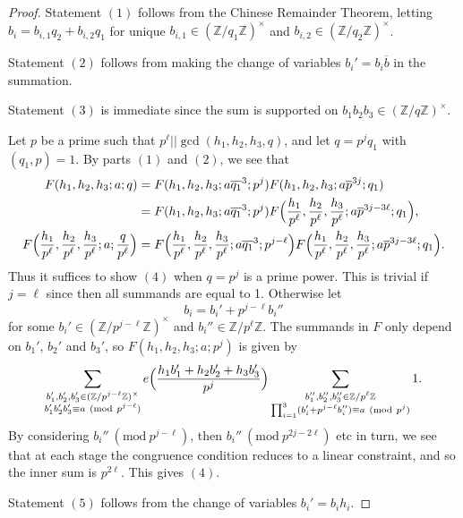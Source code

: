 \documentclass[10pt]{amsart}
\theoremstyle{plain}
\numberwithin{equation}{section}
\newcommand{\Mod}[1]{\ (\mathrm{mod}\ #1)}
\begin{document}
\begin{proof}
Statement $(1)$ follows from the Chinese Remainder Theorem, letting $b_i=b_{i,1}q_2+b_{i,2}q_1$ for unique $b_{i,1}\in(\mathbb{Z}/q_1\mathbb{Z})^\times$ and $b_{i,2}\in (\mathbb{Z}/q_2\mathbb{Z})^\times$.

Statement $(2)$ follows from making the change of variables $b_i'=b_i\overline{b}$ in the summation.

Statement $(3)$ is immediate since the sum is supported on $b_1b_2b_3\in (\mathbb{Z}/q\mathbb{Z})^\times$.

Let $p$ be a prime such that $p^\ell||\gcd(h_1,h_2,h_3,q)$, and let $q=p^jq_1$ with $(q_1,p)=1$. By parts $(1)$ and $(2)$, we see that
\begin{align*}
F(h_1,h_2,h_3;a;q)&=F(h_1,h_2,h_3;a\overline{q_1}^3;p^j)F(h_1,h_2,h_3;a\overline{p}^{3j};q_1)\\
&=F(h_1,h_2,h_3;a\overline{q_1}^3;p^j)F\Bigl(\frac{h_1}{p^\ell},\frac{h_2}{p^\ell},\frac{h_3}{p^\ell};a\overline{p}^{3j-3\ell};q_1\Bigr),\\
F\Bigl(\frac{h_1}{p^\ell},\frac{h_2}{p^\ell},\frac{h_3}{p^\ell};a;\frac{q}{p^\ell}\Bigr)&=F\Bigl(\frac{h_1}{p^\ell},\frac{h_2}{p^\ell},\frac{h_3}{p^\ell};a\overline{q_1}^3;p^{j-\ell}\Bigr)F\Bigl(\frac{h_1}{p^\ell},\frac{h_2}{p^\ell},\frac{h_3}{p^\ell};a\overline{p}^{3j-3\ell};q_1\Bigr).
\end{align*}
Thus it suffices to show $(4)$ when $q=p^j$ is a prime power. This is trivial if $j=\ell$ since then all summands are equal to 1. Otherwise let 
\[
b_i=b_{i}'+p^{j-\ell}b_{i}''
\]
for some $b_{i}'\in(\mathbb{Z}/p^{j-\ell}\mathbb{Z})^\times$ and $b_{i}''\in\mathbb{Z}/p^\ell \mathbb{Z}$. The summands in $F$ only depend on $b_{1}'$, $b_{2}'$ and $b_{3}'$, so $F(h_1,h_2,h_3;a;p^j)$ is given by
\[
\sum_{\substack{b_{1}',b_{2}',b_{3}'\in (\mathbb{Z}/p^{j-\ell}\mathbb{Z})^\times\\ b_{1}'b_{2}'b_{3}'\equiv a\Mod{p^{j-\ell}}}}e\Bigl(\frac{h_1b_1'+h_2b_2'+h_3b_3'}{p^j}\Bigr)\sum_{\substack{b_{1}'',b_{2}'',b_{3}''\in\mathbb{Z}/p^{\ell}\mathbb{Z}\\ \prod_{i=1}^3 (b_{i}'+p^{j-\ell}b_{i}'')\equiv a\Mod{p^{j}}}}1.
\]
By considering $b_i''\Mod{p^{j-\ell}}$, then $b_i''\Mod{p^{2j-2\ell}}$ etc in turn, we see that at each stage the congruence condition reduces to a linear constraint, and so the inner sum is $p^{2\ell}$. This gives $(4)$.

Statement $(5)$ follows from the change of variables $b_i'=b_i h_i$.


\end{proof}
\end{document}
